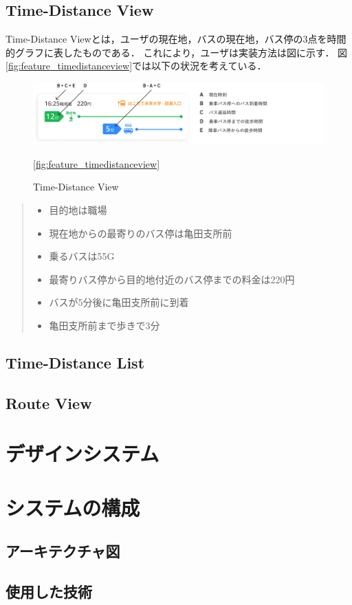 \subsection{Time-Distance View}
    Time-Distance Viewとは，ユーザの現在地，バスの現在地，バス停の3点を時間的グラフに表したものである．
    これにより，ユーザは実装方法は図\label{fig:feature_timedistanceview}に示す．
    図\ref{fig:feature_timedistanceview}では以下の状況を考えている．
    \begin{figure}
        \centering
        \includegraphics[width=14cm]{images/feature_timedistanceview.png}
        \caption{Time-Distance View}
        \ref{fig:feature_timedistanceview}
    \end{figure}
    \begin{quote}
        \begin{itemize}
            \item 目的地は職場
            \item 現在地からの最寄りのバス停は亀田支所前
            \item 乗るバスは55G
            \item 最寄りバス停から目的地付近のバス停までの料金は220円
            \item バスが5分後に亀田支所前に到着
            \item 亀田支所前まで歩きで3分
        \end{itemize}
    \end{quote}
\subsection{Time-Distance List}
\subsection{Route View}

\section{デザインシステム}

\section{システムの構成}
\subsection{アーキテクチャ図}
\subsection{使用した技術}